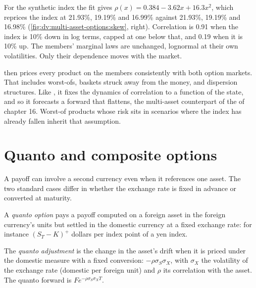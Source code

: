 \begin{example}\label{ex:dv:multi-asset-options:lc}
For the synthetic index the fit gives $\rho(x)=0.384-3.62x+16.3x^2$, which reprices the index at 21.93\%, 19.19\% and
16.99\% against 21.93\%, 19.19\% and 16.98\% (\cref{fig:dv:multi-asset-options:skew}, right). Correlation is 0.91 when the
index is 10\% down in log terms, capped at one below that, and 0.19 when it is 10\% up. The members' marginal laws are
unchanged, lognormal at their own volatilities. Only their dependence moves with the market.
\end{example}

 then prices every product on the members consistently with both option markets. That includes worst-ofs,
baskets struck away from the money, and dispersion structures. Like , it fixes the dynamics of
correlation to a function of the state, and so it forecasts a forward  that flattens, the multi-asset
counterpart of the  of chapter 16. Worst-of products whose risk sits in scenarios where the index has already
fallen inherit that assumption.

\section{Quanto and composite options}

A payoff can involve a second currency even when it references one asset. The two standard cases differ in whether the
exchange rate is fixed in advance or converted at maturity.

\begin{definition}\label{def:dv:multi-asset-options:quanto}
A \emph{quanto option} pays a payoff computed on a foreign asset in the foreign currency's units but
settled in the domestic currency at a fixed exchange rate: for instance $(S_T-K)^+$ dollars per index point of a yen
index.
\end{definition}

\begin{definition}\label{def:dv:multi-asset-options:quantoadj}
The \emph{quanto adjustment} is the change in the asset's drift when it is priced under the
domestic measure with a fixed conversion: $-\rho\sigma_S\sigma_X$, with $\sigma_X$ the volatility of the exchange rate
(domestic per foreign unit) and $\rho$ its correlation with the asset. The quanto forward is $Fe^{-\rho\sigma_S\sigma_XT}$.
\end{definition}

